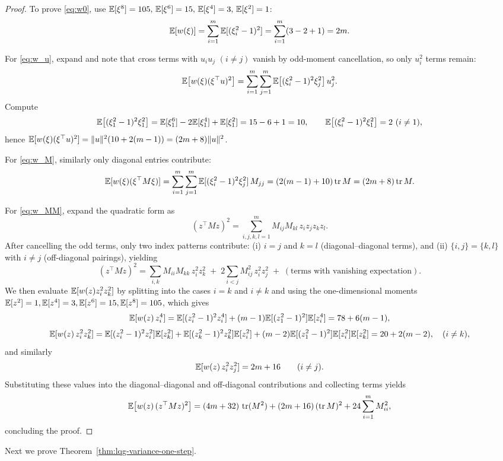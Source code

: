 \begin{proof}
To prove \eqref{eq:w0}, use ${\mathbb{E}}[\xi^8]=105,\,{\mathbb{E}}[\xi^6]=15,\,{\mathbb{E}}[\xi^4]=3,\,{\mathbb{E}}[\xi^2]=1$:
\[
{\mathbb{E}}[w(\xi)] = \sum_{i=1}^m {\mathbb{E}}[(\xi_i^2-1)^2] = \sum_{i=1}^m (3 - 2 + 1) = 2m.
\]

For \eqref{eq:w_u}, expand and note that cross terms with $u_i u_j$ $(i\neq j)$ vanish by odd-moment cancellation,
so only $u_i^2$ terms remain:
\[
{\mathbb{E}}\big[w(\xi)(\xi^\top u)^2\big]
= \sum_{i=1}^m \sum_{j=1}^m {\mathbb{E}}\big[(\xi_i^2-1)^2 \xi_j^2\big]\, u_j^2.
\]
Compute
\[
{\mathbb{E}}\big[(\xi_1^2-1)^2 \xi_1^2\big]={\mathbb{E}}[\xi_1^6]-2{\mathbb{E}}[\xi_1^4]+{\mathbb{E}}[\xi_1^2]=15-6+1=10,
\qquad
{\mathbb{E}}\big[(\xi_i^2-1)^2 \xi_1^2\big]=2\ (i\neq 1),
\]
hence ${\mathbb{E}}[w(\xi)(\xi^\top u)^2]=\|u\|^2(10+2(m-1))=(2m+8)\|u\|^2$.

For \eqref{eq:w_M}, similarly only diagonal entries contribute:
\[
{\mathbb{E}}[w(\xi)(\xi^\top M \xi)]
= \sum_{i=1}^m\sum_{j=1}^m {\mathbb{E}}[(\xi_i^2-1)^2\xi_j^2]\, M_{jj}
= (2(m-1)+10)\operatorname{tr} M
= (2m+8)\operatorname{tr} M.
\]

For \eqref{eq:w_MM}, expand the quadratic form as
\[
(z^\top M z)^2=\sum_{i,j,k,l=1}^m M_{ij}M_{kl}\,z_i z_j z_k z_l.
\]
After cancelling the odd terms, only two index patterns contribute: (i) $i=j$ and $k=l$ (diagonal--diagonal terms), and (ii) $\{i,j\}=\{k,l\}$ with $i\neq j$ (off-diagonal pairings), yielding
\[
(z^\top M z)^2
=\sum_{i,k} M_{ii}M_{kk}\,z_i^2 z_k^2
\;+\;
2\sum_{i<j} M_{ij}^2\,z_i^2 z_j^2
\;+\;(\text{terms with vanishing expectation}).
\]
We then evaluate ${\mathbb{E}}[w(z)z_i^2 z_k^2]$ by splitting into the cases $i=k$ and $i\neq k$ and using the one-dimensional moments
${\mathbb{E}}[z^2]=1,{\mathbb{E}}[z^4]=3,{\mathbb{E}}[z^6]=15,{\mathbb{E}}[z^8]=105$, which gives
\[
{\mathbb{E}}[w(z)\,z_i^4]={\mathbb{E}}[(z_i^2-1)^2 z_i^4]+(m-1){\mathbb{E}}[(z_1^2-1)^2]{\mathbb{E}}[z_i^4]=78+6(m-1),
\]
\[
{\mathbb{E}}[w(z)\,z_i^2 z_k^2]={\mathbb{E}}[(z_i^2-1)^2 z_i^2]{\mathbb{E}}[z_k^2]+{\mathbb{E}}[(z_k^2-1)^2 z_k^2]{\mathbb{E}}[z_i^2]+(m-2){\mathbb{E}}[(z_1^2-1)^2]{\mathbb{E}}[z_i^2]{\mathbb{E}}[z_k^2]
=20+2(m-2),
\quad (i\neq k),
\]
and similarly
\[
{\mathbb{E}}[w(z)\,z_i^2 z_j^2]=2m+16\qquad (i\neq j).
\]
Substituting these values into the diagonal--diagonal and off-diagonal contributions and collecting terms yields
\[
{\mathbb{E}} \big[w(z)\,(z^\top M z)^2\big]
= (4m + 32)\,\operatorname{tr}(M^2) + (2m + 16)\,(\operatorname{tr} M)^2 + 24\sum_{i=1}^m M_{ii}^2,
\]
concluding the proof.
\end{proof}

Next we prove Theorem~\ref{thm:lqg-variance-one-step}.

